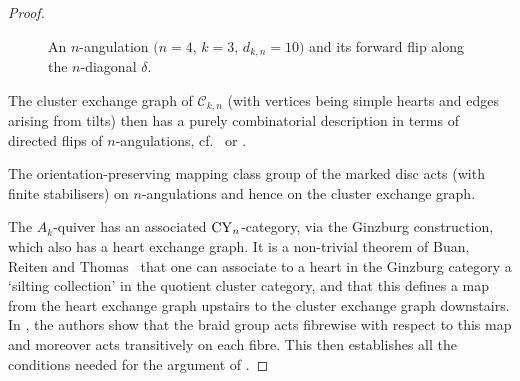 \documentclass[10pt,a4paper]{amsart}
\theoremstyle{definition}
\numberwithin{equation}{section}
\begin{document}
\begin{proof}
\begin{figure}[ht]
\caption{An $n$-angulation $(n=4$, $k=3$, $d_{k,n}=10)$ and its forward flip along the $n$-diagonal $\delta$.}\label{fig:n-diagonal}
\end{figure}


 The cluster exchange graph of $\mathcal{C}_{k,n}$ (with vertices being simple hearts and edges arising from tilts) then has a purely combinatorial description in terms of directed flips of $n$-angulations, cf.~\cite[Theorem~5.6]{Baur-Marsh} or \cite[Theorem~6.3]{Ikeda}.

 The orientation-preserving mapping class group of the marked disc acts (with finite stabilisers) on $n$-angulations and hence on the cluster exchange graph.

 The $A_k$-quiver has an associated ${\rm CY}_n$-category, via the Ginzburg construction, which also has a heart exchange graph. It is a non-trivial theorem of Buan, Reiten and Thomas~\cite{BRT} that one can associate to a heart in the Ginzburg category a `silting collection' in the quotient cluster category, and that this defines a map from the heart exchange graph upstairs to the cluster exchange graph downstairs.
 In \cite[Theorem~8.6]{King-QiuYu-cluster}, the authors show that the braid group acts fibrewise with respect to this map and moreover acts transitively on each fibre. This then establishes all the conditions needed for the argument of \cite[Theorem~9.9]{BS}.
 \end{proof}
\end{document}
